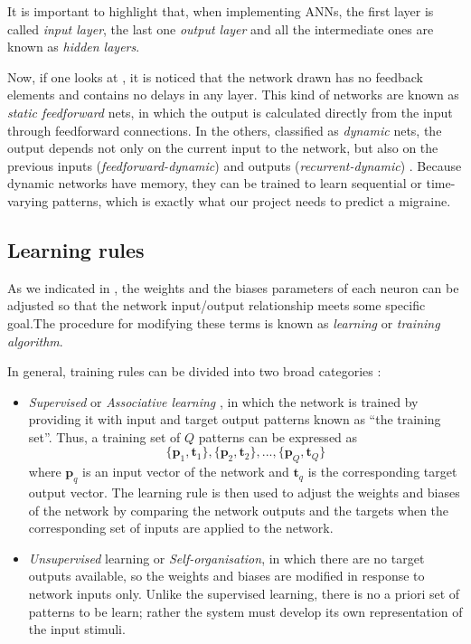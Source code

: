 It is important to highlight that, when implementing ANNs, the first
layer is called \emph{input layer}, the last one \emph{output layer}
and all the intermediate ones are known as \emph{hidden layers}.

Now, if one looks at , it is noticed that
the network drawn has no feedback elements and contains no delays in
any layer. This kind of networks are known as \emph{static
feedforward} nets, in which the output is calculated directly from the
input through feedforward connections.  In the others, classified
as \emph{dynamic} nets, the output depends not only on the current
input to the network, but also on the previous inputs
(\emph{feedforward-dynamic}) and outputs
(\emph{recurrent-dynamic}) \cite{dimith3neural}.  Because dynamic
networks have memory, they can be trained to learn sequential or
time-varying patterns, which is exactly what our project needs to
predict a migraine.


\subsection{Learning rules}
\label{subsec:learningrules}

As we indicated in , the weights and the biases
parameters of each neuron can be adjusted so that the network
input/output relationship meets some specific goal.The procedure for
modifying these terms is known as \emph{learning} or \emph{training
algorithm}.

In general, training rules can be divided into two broad
categories \cite{demuth2008neural}:
\begin{itemize}
\item \emph{Supervised} or \emph{Associative learning}
, in which the network is trained by providing it with input and
target output patterns known as ``the training set''. Thus, a training
set of $Q$ patterns can be expressed as
\begin{equation}
\{\mathbf{p}_1,\mathbf{t}_1\},\{\mathbf{p}_2,\mathbf{t}_2\}, ... , \{\mathbf{p}_Q,\mathbf{t}_Q\}
\end{equation}
where $\mathbf{p}_q$ is an input vector of the network and
$\mathbf{t}_q$ is the corresponding target output vector.  The
learning rule is then used to adjust the weights and biases of the
network by comparing the network outputs and the targets when the
corresponding set of inputs are applied to the network.
\item \emph{Unsupervised} learning or \emph{Self-organisation}, in which there are no target outputs available, so the weights and biases are modified in response to network inputs only. 
Unlike the supervised learning, there is no a priori set of patterns
to be learn; rather the system must develop its own representation of
the input stimuli.
\end{itemize}

